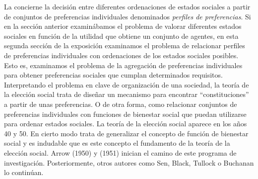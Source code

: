\documentclass{nuevotema}
\begin{document}
La  concierne la decisión entre diferentes ordenaciones de estados sociales a partir de conjuntos de preferencias individuales denominados \textit{perfiles de preferencias}. Si en la sección anterior examinábamos el problema de valorar diferentes estados sociales en función de la utilidad que obtiene un conjunto de agentes, en esta segunda sección de la exposición examinamos el problema de relacionar perfiles de preferencias individuales con ordenaciones de los estados sociales posibles. Esto es, examinamos el problema de la agregación de preferencias individuales para obtener preferencias sociales que cumplan determinados requisitos. Interpretando el problema en clave de organización de una sociedad, la teoría de la elección social trata de diseñar un mecanismo para encontrar ``constituciones'' a partir de unas preferencias. O de otra forma, como relacionar conjuntos de preferencias individuales con funciones de bienestar social que puedan utilizarse para ordenar estados sociales. La teoría de la elección social aparece en los años 40 y 50. En cierto modo trata de generalizar el concepto de función de bienestar social y es indudable que es este concepto el fundamento de la teoría de la elección social. Arrow (1950) y (1951) inician el camino de este programa de investigación. Posteriormente, otros autores como Sen, Black, Tullock o Buchanan lo continúan.
\end{document}

